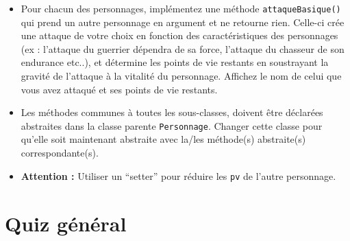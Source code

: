 \begin{Exercice}[15 minutes]
\begin{itemize}
        
    
        \item Pour chacun des personnages, implémentez une méthode \lstinline{attaqueBasique()} qui prend un autre personnage en argument et ne retourne rien. Celle-ci crée une attaque de votre choix en fonction des caractéristiques des personnages (ex : l’attaque du guerrier dépendra de sa force, l’attaque du chasseur de son endurance etc..), et détermine les points de vie restants en soustrayant la gravité de l'attaque à la vitalité du personnage. Affichez le nom de celui que vous avez attaqué et ses points de vie restants.
        \item Les méthodes communes à toutes les sous-classes, doivent être déclarées abstraites dans la classe parente \lstinline{Personnage}. Changer cette classe pour qu'elle soit maintenant abstraite avec la/les méthode(s) abstraite(s) correspondante(s).
        \item \textbf{Attention :} Utiliser un ``setter'' pour réduire les \lstinline{pv} de l’autre personnage.
        
        
    \end{itemize}
    
    \begin{solution}
        
    \end{solution}
    \begin{solution}
        
    \end{solution}
    
    \begin{solution}
        
    \end{solution}
    \begin{solution}
        
    \end{solution}
    \end{Exercice}
    
  
    
\section{Quiz général}

